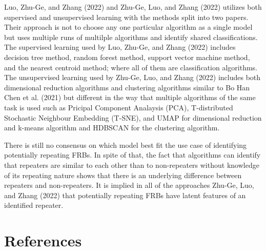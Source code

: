 \documentclass[
  letterpaper,
  DIV=11,
  numbers=noendperiod]{scrreport}
\begin{document}
Luo, Zhu-Ge, and Zhang (2022) and Zhu-Ge, Luo, and Zhang (2022) utilizes
both supervised and unsupervised learning with the methods split into
two papers. Their approach is not to choose any one particular algorithm
as a single model but uses multiple runs of multilple algorithms and
identify shared classifications. The supervised learning used by Luo,
Zhu-Ge, and Zhang (2022) includes decision tree method, random forest
method, support vector machine method, and the nearest centroid method;
where all of them are classification algorithms. The unsupervised
learning used by Zhu-Ge, Luo, and Zhang (2022) includes both dimensional
reduction algorithms and clustering algorithms similar to Bo Han Chen et
al. (2021) but different in the way that multiple algorithms of the same
task is used such as Pricipal Component Analaysis (PCA), T-distributed
Stochastic Neighbour Embedding (T-SNE), and UMAP for dimensional
reduction and k-means algorithm and HDBSCAN for the clustering
algorithm.

There is still no consensus on which model best fit the use case of
identifying potentially repeating FRBs. In spite of that, the fact that
algorithms can identify that repeaters are similar to each other than to
non-repeaters without knowledge of its repeating nature shows that there
is an underlying difference between repeaters and non-repeaters. It is
implied in all of the approaches Zhu-Ge, Luo, and Zhang (2022) that
potentially repeating FRBs have latent features of an identified
repeater.


\hypertarget{references}{%
\chapter*{References}\label{references}}

\end{document}
